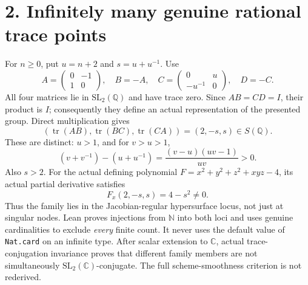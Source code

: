 \documentclass[10pt]{article}
\begin{document}
\section*{2. Infinitely many genuine rational trace points}
For $n\geq0$, put $u=n+2$ and $s=u+u^{-1}$. Use
\[
 A=\begin{pmatrix}0&-1\\1&0\end{pmatrix},\quad B=-A,\quad
 C=\begin{pmatrix}0&u\\-u^{-1}&0\end{pmatrix},\quad D=-C.
\]
All four matrices lie in $\mathrm{SL}_2(\mathbb Q)$ and have trace zero. Since $AB=CD=I$, their product is $I$; consequently they define an actual representation of the presented group. Direct multiplication gives
\[
 (\operatorname{tr}(AB),\operatorname{tr}(BC),\operatorname{tr}(CA))=(2,-s,s)\in S(\mathbb Q).
\]
These are distinct: $u>1$, and for $v>u>1$,
\[
 (v+v^{-1})-(u+u^{-1})=\frac{(v-u)(uv-1)}{uv}>0.
\]
Also $s>2$. For the actual defining polynomial $F=x^2+y^2+z^2+xyz-4$, its actual partial derivative satisfies
\[
 F_x(2,-s,s)=4-s^2\ne0.
\]
Thus the family lies in the Jacobian-regular hypersurface locus, not just at singular nodes. Lean proves injections from $\mathbb N$ into both loci and uses genuine cardinalities to exclude \emph{every} finite count. It never uses the default value of \texttt{Nat.card} on an infinite type. After scalar extension to $\mathbb C$, actual trace-conjugation invariance proves that different family members are not simultaneously $\mathrm{SL}_2(\mathbb C)$-conjugate. The full scheme-smoothness criterion is not rederived.

\newpage
\end{document}
